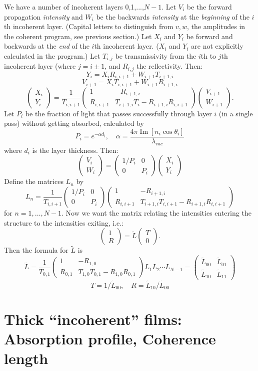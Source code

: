 \documentclass[12pt]{article}
\newcommand{\smat}{\left( \begin{matrix}} %
\newcommand{\emat}{\end{matrix} \right)} %
\renewcommand{\(}{\left(}
\renewcommand{\)}{\right)}
\renewcommand{\Im}{\operatorname{Im}}
\begin{document}
We have a number of incoherent layers 0,1,...,$N-1$. Let $V_i$ be the forward propagation \emph{intensity} and $W_i$ be the backwards \emph{intensity} at the \emph{beginning} of the $i$th incoherent layer. (Capital letters to distinguish from $v,w$, the amplitudes in the coherent program, see previous section.) Let $X_i$ and $Y_i$ be forward and backwards at the \emph{end} of the $i$th incoherent layer. ($X_i$ and $Y_i$ are not explicitly calculated in the program.) Let $T_{i,j}$ be transmissivity from the $i$th to $j$th incoherent layer (where $j=i\pm 1$, and $R_{i,j}$ the reflectivity. Then:
$$Y_i = X_i R_{i,i+1} + W_{i+1} T_{i+1,i}$$
$$V_{i+1} = X_i T_{i,i+1} + W_{i+1} R_{i+1,i}$$
$$\smat X_i \\ Y_i \emat = \frac{1}{T_{i,i+1}} \smat 1 & -R_{i+1,i} \\  R_{i,i+1} & T_{i+1,i}T_i -  R_{i+1,i}R_{i,i+1} \emat \smat V_{i+1} \\ W_{i+1} \emat.$$
Let $P_i$ be the fraction of light that passes successfully through layer $i$ (in a single pass) without getting absorbed, calculated by
$$P_i = e^{-\alpha d_i}, \quad \alpha = \frac{4\pi \Im[n_i \cos \theta_i]}{\lambda_{vac}}$$
where $d_i$ is the layer thickness. Then:
$$\smat V_i \\ W_i \emat = \smat 1/P_i & 0 \\ 0 & P_i \emat \smat X_i \\ Y_i \emat$$
Define the matrices $L_n$ by
$$L_n =  \frac{1}{T_{i,i+1}} \smat 1/P_i & 0 \\ 0 & P_i \emat \smat 1 & -R_{i+1,i} \\  R_{i,i+1} & T_{i+1,i}T_{i,i+1} -  R_{i+1,i}R_{i,i+1} \emat$$
for $n=1,\ldots,N-1$. Now we want the matrix relating the intensities  entering the structure to the intensities exiting, i.e.:
$$\smat 1 \\ R \emat = \tilde{L} \smat T \\ 0 \emat.$$
Then the formula for $\tilde{L}$ is
$$\tilde{L} = \frac{1}{T_{0,1}} \smat 1 & -R_{1,0} \\  R_{0,1} & T_{1,0}T_{0,1} -  R_{1,0}R_{0,1} \emat L_1 L_2 \cdots L_{N-1} = \smat \tilde{L}_{00} & \tilde{L}_{01} \\ \tilde{L}_{10} & \tilde{L}_{11} \emat$$
$$T = 1/\tilde{L}_{00}, \quad R = \tilde{L}_{10}/\tilde{L}_{00}$$

\section{Thick ``incoherent'' films: Absorption profile, Coherence length}
\end{document}
